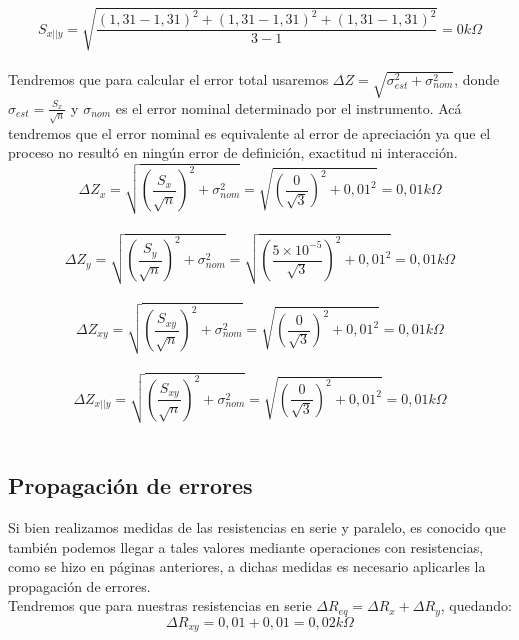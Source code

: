 \documentclass[12pt]{article}
\begin{document}
	\\
	\begin{equation}
		S_{x||y} = \sqrt{\frac{(1,31 - 1,31)^2 + (1,31 - 1,31)^2 + (1,31 - 1,31)^2}{3 - 1}} = 0 k\Omega
	\end{equation}
	\\
	\noindent Tendremos que para calcular el error total usaremos $\Delta Z = \sqrt{\sigma_{est}^2 + \sigma_{nom}^2}$, donde $\sigma_{est} = \frac{S_x}{\sqrt n}$ y $\sigma_{nom}$ es el error nominal determinado por el instrumento. Acá tendremos que el error nominal es equivalente al error de apreciación ya que el proceso no resultó en ningún error de definición, exactitud ni interacción.\\
	\begin{equation}
		\Delta Z_x = \sqrt{(\frac{S_x}{\sqrt n})^2 + \sigma_{nom}^2} = \sqrt{(\frac{0}{\sqrt 3})^2 + 0,01^2} = 0,01k\Omega
	\end{equation}
	\\
	\begin{equation}
		\Delta Z_y = \sqrt{(\frac{S_y}{\sqrt n})^2 + \sigma_{nom}^2} = \sqrt{(\frac{5\times 10^{-5}}{\sqrt 3})^2 + 0,01^2} = 0,01k\Omega
	\end{equation}
	\\
	\begin{equation}
		\Delta Z_{xy} = \sqrt{(\frac{S_{xy}}{\sqrt n})^2 + \sigma_{nom}^2} = \sqrt{(\frac{0}{\sqrt 3})^2 + 0,01^2} = 0,01k\Omega
	\end{equation}
	\\
	\begin{equation}
		\Delta Z_{x||y} = \sqrt{(\frac{S_{xy}}{\sqrt n})^2 + \sigma_{nom}^2} = \sqrt{(\frac{0}{\sqrt 3})^2 + 0,01^2} = 0,01k\Omega
	\end{equation}
	\\
	\subsection{Propagación de errores}
	\noindent Si bien realizamos medidas de las resistencias en serie y paralelo, es conocido que también podemos llegar a tales valores mediante operaciones con resistencias, como se hizo en páginas anteriores, a dichas medidas es necesario aplicarles la propagación de errores.
	\\
	
	\noindent Tendremos que para nuestras resistencias en serie $\Delta R_{eq} = \Delta R_x + \Delta R_y$, quedando:\\
	\begin{equation}
		\Delta R_{xy} = 0,01 + 0,01 = 0,02k\Omega
	\end{equation}
	\\
	
\end{document}
